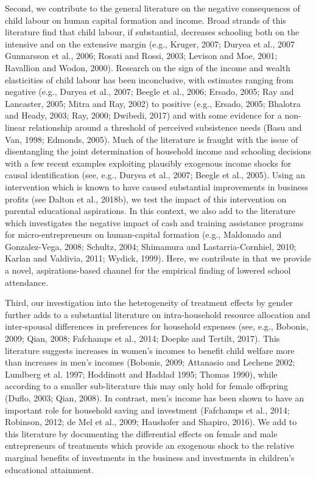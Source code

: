 \documentclass[11.5pt]{article}
\begin{document}
Second, we contribute to the general literature on the negative consequences of child labour on human capital formation and income. Broad strands of this literature find that child labour, if substantial, decreases schooling both on the intensive and on the extensive margin (e.g., Kruger, 2007; Duryea et al., 2007 Gunnarsson et al., 2006; Rosati and Rossi, 2003; Levison and Moe, 2001; Ravallion and Wodon, 2000). Research on the sign of the income and wealth elasticities of child labour has been inconclusive, with estimates ranging from negative (e.g., Duryea et al., 2007; Beegle et al., 2006; Ersado, 2005; Ray and Lancaster, 2005; Mitra and Ray, 2002) to positive (e.g., Ersado, 2005; Bhalotra and Heady, 2003; Ray, 2000; Dwibedi, 2017) and with some evidence for a non-linear relationship around a threshold of perceived subsistence needs (Basu and Van, 1998; Edmonds, 2005). Much of the literature is fraught with the issue of disentangling the joint determination of household income and schooling decisions with a few recent examples exploiting plausibly exogenous income shocks for causal identification (see, e.g., Duryea et al., 2007; Beegle et al., 2005). Using an intervention which is known to have caused substantial improvements in business profits (see Dalton et al., 2018b), we test the impact of this intervention on parental educational aspirations. In this context, we also add to the literature which investigates the negative impact of cash and training assistance programs for micro-entrepreneurs on human-capital formation (e.g., Maldonado and Gonzalez-Vega, 2008; Schultz, 2004; Shimamura and Lastarria-Cornhiel, 2010; Karlan and Valdivia, 2011; Wydick, 1999). Here, we contribute in that we provide a novel, aspirations-based channel for the empirical finding of lowered school attendance.

Third, our investigation into the heterogeneity of treatment effects by gender further adds to a substantial literature on intra-household resource allocation and inter-spousal differences in preferences for household expenses (see, e.g., Bobonis, 2009; Qian, 2008; Fafchamps et al., 2014; Doepke and Tertilt, 2017). This literature suggests increases in women's incomes to benefit child welfare more than increases in men's incomes (Bobonis, 2009; Attanasio and Lechene 2002; Lundberg et al. 1997; Hoddinott and Haddad 1995; Thomas 1990), while according to a smaller sub-literature this may only hold for female offspring (Duflo, 2003; Qian, 2008). In contrast, men's income has been shown to have an important role for household saving and investment (Fafchamps et al., 2014; Robinson, 2012; de Mel et al., 2009; Haushofer and Shapiro, 2016). We add to this literature by documenting the differential effects on female and male entrepreneurs of treatments which provide an exogenous shock to the relative marginal benefits of investments in the business and investments in children's educational attainment.
\end{document}
